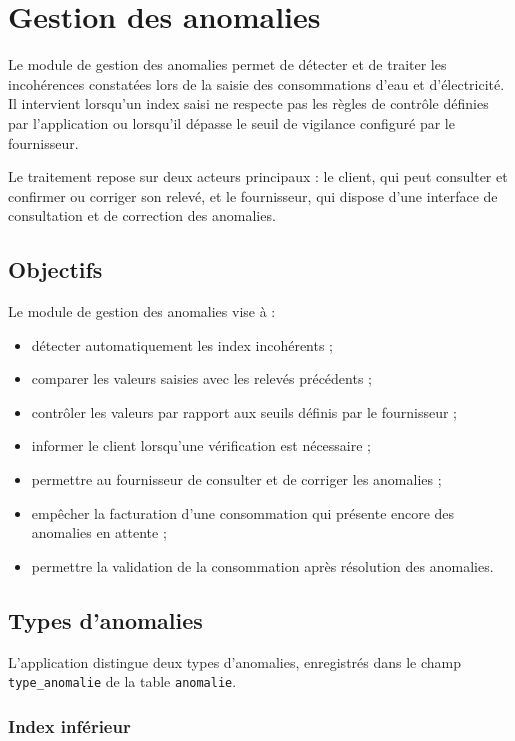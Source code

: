 
\chapter{Gestion des anomalies}
\label{chap:anomalies}

Le module de gestion des anomalies permet de détecter et de traiter les incohérences constatées lors de la saisie des consommations d'eau et d'électricité. Il intervient lorsqu'un index saisi ne respecte pas les règles de contrôle définies par l'application ou lorsqu'il dépasse le seuil de vigilance configuré par le fournisseur.

Le traitement repose sur deux acteurs principaux : le client, qui peut consulter et confirmer ou corriger son relevé, et le fournisseur, qui dispose d'une interface de consultation et de correction des anomalies.

\section{Objectifs}

Le module de gestion des anomalies vise à :
\begin{itemize}
    \item détecter automatiquement les index incohérents ;
    \item comparer les valeurs saisies avec les relevés précédents ;
    \item contrôler les valeurs par rapport aux seuils définis par le fournisseur ;
    \item informer le client lorsqu'une vérification est nécessaire ;
    \item permettre au fournisseur de consulter et de corriger les anomalies ;
    \item empêcher la facturation d'une consommation qui présente encore des anomalies en attente ;
    \item permettre la validation de la consommation après résolution des anomalies.
\end{itemize}

\section{Types d'anomalies}

L'application distingue deux types d'anomalies, enregistrés dans le champ \texttt{type\_anomalie} de la table \texttt{anomalie}.

\subsection{Index inférieur}

